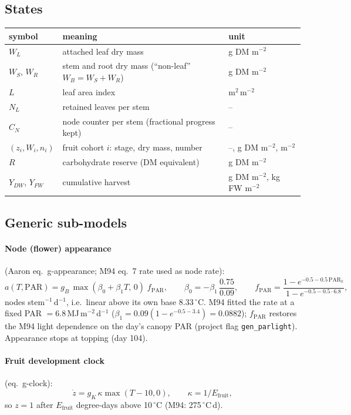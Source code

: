 \documentclass[11pt,a4paper]{article}
\begin{document}
\subsection{States}
\begin{center}\small
\begin{tabular}{lll}
\toprule
symbol & meaning & unit\\
\midrule
$W_L$ & attached leaf dry mass & g DM m$^{-2}$\\
$W_S$, $W_R$ & stem and root dry mass (``non-leaf'' $W_B=W_S+W_R$) & g DM m$^{-2}$\\
$L$ & leaf area index & m$^2$\,m$^{-2}$\\
$N_L$ & retained leaves per stem & --\\
$C_N$ & node counter per stem (fractional progress kept) & --\\
$(z_i,W_i,n_i)$ & fruit cohort $i$: stage, dry mass, number & --, g DM m$^{-2}$, m$^{-2}$\\
$R$ & carbohydrate reserve (DM equivalent) & g DM m$^{-2}$\\
$Y_{DW}$, $Y_{FW}$ & cumulative harvest & g DM m$^{-2}$, kg FW m$^{-2}$\\
\bottomrule
\end{tabular}
\end{center}

\subsection{Generic sub-models}
\paragraph{Node (flower) appearance} (Aaron eq.~g-appearance; M94 eq.~7 rate used as node rate):
\begin{equation}\label{eq:a-app}
a(T,\mathrm{PAR})=g_B\,\max(\beta_0+\beta_1T,\,0)\;f_{\text{PAR}},\qquad \beta_0=-\beta_1\,\frac{0.75}{0.09},
\qquad f_{\text{PAR}}=\frac{1-e^{-0.5-0.5\,\mathrm{PAR}_k}}{1-e^{-0.5-0.5\cdot6.8}},
\end{equation}
nodes stem$^{-1}$\,d$^{-1}$, i.e.\ linear above its own base $8.33\,^\circ$C. M94 fitted the rate at a fixed
PAR $=6.8$\,MJ\,m$^{-2}$\,d$^{-1}$ ($\beta_1=0.09(1-e^{-0.5-3.4})=0.0882$); $f_{\text{PAR}}$ restores the M94 light
dependence on the day's canopy PAR (project flag \texttt{gen\_parlight}). Appearance stops at topping (day 104).

\paragraph{Fruit development clock} (eq.~g-clock):
\begin{equation}
\dot z=g_K\,\kappa\max(T-10,0),\qquad \kappa=1/E_{\text{fruit}},
\end{equation}
so $z=1$ after $E_{\text{fruit}}$ degree-days above 10\,$^\circ$C (M94: 275\,$^\circ$C\,d).
\end{document}
